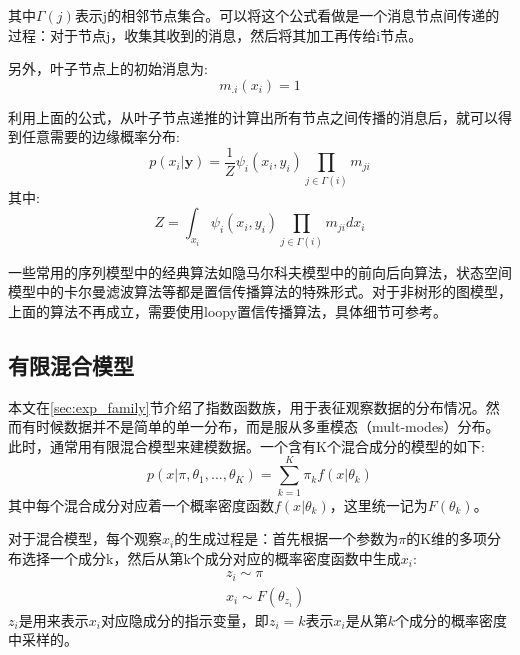 其中$\Gamma(j)$表示j的相邻节点集合。可以将这个公式看做是一个消息节点间传递的过程：对于节点j，收集其收到的消息，然后将其加工再传给i节点。

另外，叶子节点上的初始消息为:
\begin{equation}
{m_{.i}(x_i)} = 1 \label{eq:massage_passing_leaf}
\end{equation}

利用上面的公式，从叶子节点递推的计算出所有节点之间传播的消息后，就可以得到任意需要的边缘概率分布:
\begin{equation}
p(x_i|{\bm y}) = \frac{1}{Z} \psi_i(x_i,y_i)\prod_{j \in \Gamma(i)}{m_{ji}}
\end{equation}
其中:
\begin{equation}
Z =  \int_{x_i} {\psi_i(x_i,y_i)\prod_{j \in \Gamma(i)}{m_{ji}}} d {x_i}
\end{equation}

一些常用的序列模型中的经典算法如隐马尔科夫模型中的前向后向算法\cite{rabiner1989tutorial}，状态空间模型中的卡尔曼滤波算法等都是置信传播算法的特殊形式。对于非树形的图模型，上面的算法不再成立，需要使用loopy置信传播算法，具体细节可参考\cite{pearl1988probabilistic}。

\subsection{有限混合模型}\label{sec:finite_mix}
本文在\ref{sec:exp_family}节介绍了指数函数族，用于表征观察数据的分布情况。然而有时候数据并不是简单的单一分布，而是服从多重模态（mult-modes）分布。此时，通常用有限混合模型\cite{mclachlan2004finite}来建模数据。一个含有K个混合成分的模型的如下:
\begin{equation}
p(x |\pi,\theta_1,...,\theta_K) = \sum_{k=1}^K{\pi_kf(x|\theta_k)} \label{eq:mix_dis}
\end{equation}
其中每个混合成分对应着一个概率密度函数$f(x|\theta_k)$，这里统一记为$F(\theta_k)$。

对于混合模型，每个观察$x_i$的生成过程是：首先根据一个参数为$\pi$的K维的多项分布选择一个成分k，然后从第k个成分对应的概率密度函数中生成$x_i$:
\begin{equation}
\begin{split}
& z_i \sim \pi\\
& x_i \sim F(\theta_{z_i}) \label{eq:aux_finite_mix_g}
\end{split}
\end{equation}
$z_i$是用来表示$x_i$对应隐成分的指示变量，即$z_i = k $表示$x_i$是从第$k$个成分的概率密度中采样的。

